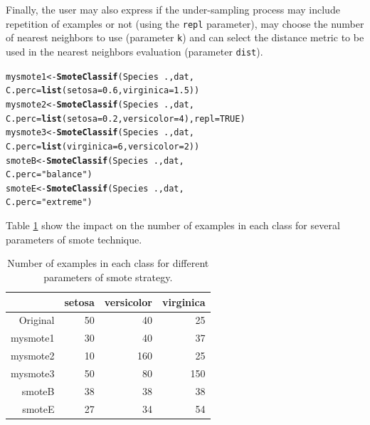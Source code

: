 \documentclass[10pt,a4paper]{article}\usepackage[]{graphicx}\usepackage[]{color}
\makeatletter
\newcommand{\hlnum}[1]{\textcolor[rgb]{0.686,0.059,0.569}{#1}}%
\newcommand{\hlstr}[1]{\textcolor[rgb]{0.192,0.494,0.8}{#1}}%
\newcommand{\hlopt}[1]{\textcolor[rgb]{0,0,0}{#1}}%
\newcommand{\hlstd}[1]{\textcolor[rgb]{0.345,0.345,0.345}{#1}}%
\newcommand{\hlkwb}[1]{\textcolor[rgb]{0.69,0.353,0.396}{#1}}%
\newcommand{\hlkwc}[1]{\textcolor[rgb]{0.333,0.667,0.333}{#1}}%
\newcommand{\hlkwd}[1]{\textcolor[rgb]{0.737,0.353,0.396}{\textbf{#1}}}%
\newenvironment{kframe}{%
 \def\at@end@of@kframe{}%
 \ifinner\ifhmode%
  \def\at@end@of@kframe{\end{minipage}}%
  \begin{minipage}{\columnwidth}%
 \fi\fi%
 \def\FrameCommand##1{\hskip\@totalleftmargin \hskip-\fboxsep
 \colorbox{shadecolor}{##1}\hskip-\fboxsep
     \hskip-\linewidth \hskip-\@totalleftmargin \hskip\columnwidth}%
 \MakeFramed {\advance\hsize-\width
   \@totalleftmargin\z@ \linewidth\hsize
   \@setminipage}}%
 {\par\unskip\endMakeFramed%
 \at@end@of@kframe}
\newenvironment{knitrout}{}{} %
\makeatother
\begin{document}
Finally, the user may also express if the under-sampling process may include repetition of examples or not (using the \texttt{repl} parameter), may choose the number of nearest neighbors to use (parameter \texttt{k}) and can select the distance metric to be used in the nearest neighbors evaluation (parameter \texttt{dist}). 


\begin{knitrout}\footnotesize
{}\color{fgcolor}\begin{kframe}
\begin{alltt}
  \hlstd{mysmote1} \hlkwb{<-} \hlkwd{SmoteClassif}\hlstd{(Species}\hlopt{~}\hlstd{., dat,}
                           \hlkwc{C.perc}\hlstd{=}\hlkwd{list}\hlstd{(}\hlkwc{setosa}\hlstd{=}\hlnum{0.6}\hlstd{,} \hlkwc{virginica}\hlstd{=}\hlnum{1.5}\hlstd{))}
  \hlstd{mysmote2} \hlkwb{<-} \hlkwd{SmoteClassif}\hlstd{(Species}\hlopt{~}\hlstd{., dat,}
                           \hlkwc{C.perc}\hlstd{=}\hlkwd{list}\hlstd{(}\hlkwc{setosa}\hlstd{=}\hlnum{0.2}\hlstd{,} \hlkwc{versicolor}\hlstd{=}\hlnum{4}\hlstd{),} \hlkwc{repl}\hlstd{=}\hlnum{TRUE}\hlstd{)}
  \hlstd{mysmote3} \hlkwb{<-} \hlkwd{SmoteClassif}\hlstd{(Species}\hlopt{~}\hlstd{., dat,}
                           \hlkwc{C.perc}\hlstd{=}\hlkwd{list}\hlstd{(}\hlkwc{virginica}\hlstd{=}\hlnum{6}\hlstd{,} \hlkwc{versicolor}\hlstd{=}\hlnum{2}\hlstd{))}
  \hlstd{smoteB} \hlkwb{<-} \hlkwd{SmoteClassif}\hlstd{(Species}\hlopt{~}\hlstd{., dat,}
                           \hlkwc{C.perc}\hlstd{=}\hlstr{"balance"}\hlstd{)}
  \hlstd{smoteE} \hlkwb{<-} \hlkwd{SmoteClassif}\hlstd{(Species}\hlopt{~}\hlstd{., dat,}
                           \hlkwc{C.perc}\hlstd{=}\hlstr{"extreme"}\hlstd{)}
\end{alltt}
\end{kframe}
\end{knitrout}


Table \ref{tab:iris_smote_table} show the impact on the number of examples in each class for several parameters of smote technique.

\begin{table}[ht]
\centering
\begin{tabular}{rrrr}
  \hline
 & setosa & versicolor & virginica \\ 
  \hline
Original &  50 &  40 &  25 \\ 
  mysmote1 &  30 &  40 &  37 \\ 
  mysmote2 &  10 & 160 &  25 \\ 
  mysmote3 &  50 &  80 & 150 \\ 
  smoteB &  38 &  38 &  38 \\ 
  smoteE &  27 &  34 &  54 \\ 
   \hline
\end{tabular}
\caption{Number of examples in each class for different parameters of smote strategy.} 
\label{tab:iris_smote_table}
\end{table}
\end{document}
